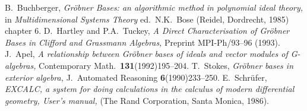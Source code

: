 \begin{thebibliography}{M}

	B.~Buchberger, {\em
	Gr{\"o}bner Bases: an algorithmic method in polynomial ideal theory,}
	in {\em Multidimensional Systems Theory\/} ed.~N.K.~Bose
	(Reidel, Dordrecht, 1985) chapter 6.
	D.~Hartley and P.A.~Tuckey, {\em
	A Direct Characterisation of Gr{\"o}bner Bases in Clifford and
	Grassmann Algebras,}
	Preprint MPI-Ph/93--96 (1993).
	J.~Apel, {\em A relationship between Gr{\"o}bner bases of ideals and
	vector modules of G-algebras,}
	Contemporary Math.~{\bf 131}(1992)195--204.
	T.~Stokes, {\em
	Gr{\"o}bner bases in exterior algebra,}
	J.~Automated Reasoning {\bf 6}(1990)233--250.
	E.~Schr{\"u}fer, {\em
	EXCALC, a system for doing calculations in the calculus of modern
	differential geometry, User's manual,}
	(The Rand Corporation, Santa Monica, 1986).

\end{thebibliography}




